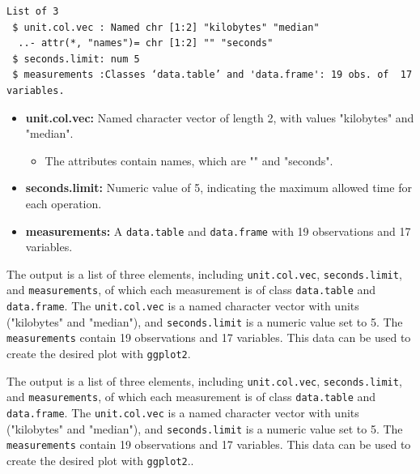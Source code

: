 \begin{verbatim}
List of 3
 $ unit.col.vec : Named chr [1:2] "kilobytes" "median"
  ..- attr(*, "names")= chr [1:2] "" "seconds"
 $ seconds.limit: num 5
 $ measurements :Classes ‘data.table’ and 'data.frame':	19 obs. of  17 variables.
\end{verbatim}

\begin{itemize}
    \item \textbf{unit.col.vec:} Named character vector of length 2, with values "kilobytes" and "median".
    \begin{itemize}
        \item The attributes contain names, which are "" and "seconds".
    \end{itemize}

    \item \textbf{seconds.limit:} Numeric value of 5, indicating the maximum allowed time for each operation.

    \item \textbf{measurements:} A \texttt{data.table} and \texttt{data.frame} with 19 observations and 17 variables.
\end{itemize}


\noindent The output is a list of three elements, including \texttt{unit.col.vec}, \texttt{seconds.limit}, and \texttt{measurements}, of which each measurement is of class \texttt{data.table} and \texttt{data.frame}. The \texttt{unit.col.vec} is a named character vector with units ("kilobytes" and "median"), and \texttt{seconds.limit} is a numeric value set to 5. The \texttt{measurements} contain 19 observations and 17 variables. This data can be used to create the desired plot with \texttt{ggplot2}.

\noindent The output is a list of three elements, including \texttt{unit.col.vec}, \texttt{seconds.limit}, and \texttt{measurements}, of which each measurement is of class \texttt{data.table} and \texttt{data.frame}. The \texttt{unit.col.vec} is a named character vector with units ("kilobytes" and "median"), and \texttt{seconds.limit} is a numeric value set to 5. The \texttt{measurements} contain 19 observations and 17 variables. This data can be used to create the desired plot with \texttt{ggplot2}..



